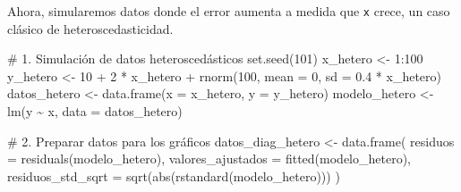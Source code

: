 \documentclass[
  letterpaper,
  DIV=11,
  numbers=noendperiod]{scrreprt}
\newenvironment{Shaded}{\begin{snugshade}}{\end{snugshade}}
\newcommand{\AttributeTok}[1]{\textcolor[rgb]{0.40,0.45,0.13}{#1}}
\newcommand{\CommentTok}[1]{\textcolor[rgb]{0.37,0.37,0.37}{#1}}
\newcommand{\DecValTok}[1]{\textcolor[rgb]{0.68,0.00,0.00}{#1}}
\newcommand{\FloatTok}[1]{\textcolor[rgb]{0.68,0.00,0.00}{#1}}
\newcommand{\FunctionTok}[1]{\textcolor[rgb]{0.28,0.35,0.67}{#1}}
\newcommand{\NormalTok}[1]{\textcolor[rgb]{0.00,0.23,0.31}{#1}}
\newcommand{\OtherTok}[1]{\textcolor[rgb]{0.00,0.23,0.31}{#1}}
\newcommand{\SpecialCharTok}[1]{\textcolor[rgb]{0.37,0.37,0.37}{#1}}
\begin{document}
\begin{tcolorbox}[enhanced jigsaw, breakable, toprule=.15mm, bottomtitle=1mm, coltitle=black, colbacktitle=quarto-callout-tip-color!10!white, titlerule=0mm, opacitybacktitle=0.6, bottomrule=.15mm, toptitle=1mm, title=\textcolor{quarto-callout-tip-color}{\faLightbulb}\hspace{0.5em}{Contraejemplo: Violación del supuesto de homocedasticidad}, arc=.35mm, rightrule=.15mm, opacityback=0, colframe=quarto-callout-tip-color-frame, leftrule=.75mm, left=2mm, colback=white]

Ahora, simularemos datos donde el error aumenta a medida que \texttt{x}
crece, un caso clásico de heteroscedasticidad.

\begin{Shaded}
\begin{Highlighting}[]
\CommentTok{\# 1. Simulación de datos heteroscedásticos}
\FunctionTok{set.seed}\NormalTok{(}\DecValTok{101}\NormalTok{)}
\NormalTok{x\_hetero }\OtherTok{\textless{}{-}} \DecValTok{1}\SpecialCharTok{:}\DecValTok{100}
\NormalTok{y\_hetero }\OtherTok{\textless{}{-}} \DecValTok{10} \SpecialCharTok{+} \DecValTok{2} \SpecialCharTok{*}\NormalTok{ x\_hetero }\SpecialCharTok{+} \FunctionTok{rnorm}\NormalTok{(}\DecValTok{100}\NormalTok{, }\AttributeTok{mean =} \DecValTok{0}\NormalTok{, }\AttributeTok{sd =} \FloatTok{0.4} \SpecialCharTok{*}\NormalTok{ x\_hetero)}
\NormalTok{datos\_hetero }\OtherTok{\textless{}{-}} \FunctionTok{data.frame}\NormalTok{(}\AttributeTok{x =}\NormalTok{ x\_hetero, }\AttributeTok{y =}\NormalTok{ y\_hetero)}
\NormalTok{modelo\_hetero }\OtherTok{\textless{}{-}} \FunctionTok{lm}\NormalTok{(y }\SpecialCharTok{\textasciitilde{}}\NormalTok{ x, }\AttributeTok{data =}\NormalTok{ datos\_hetero)}

\CommentTok{\# 2. Preparar datos para los gráficos}
\NormalTok{datos\_diag\_hetero }\OtherTok{\textless{}{-}} \FunctionTok{data.frame}\NormalTok{(}
  \AttributeTok{residuos =} \FunctionTok{residuals}\NormalTok{(modelo\_hetero),}
  \AttributeTok{valores\_ajustados =} \FunctionTok{fitted}\NormalTok{(modelo\_hetero),}
  \AttributeTok{residuos\_std\_sqrt =} \FunctionTok{sqrt}\NormalTok{(}\FunctionTok{abs}\NormalTok{(}\FunctionTok{rstandard}\NormalTok{(modelo\_hetero)))}
\NormalTok{)}


\end{Highlighting}
\end{Shaded}
\end{tcolorbox}
\end{document}
